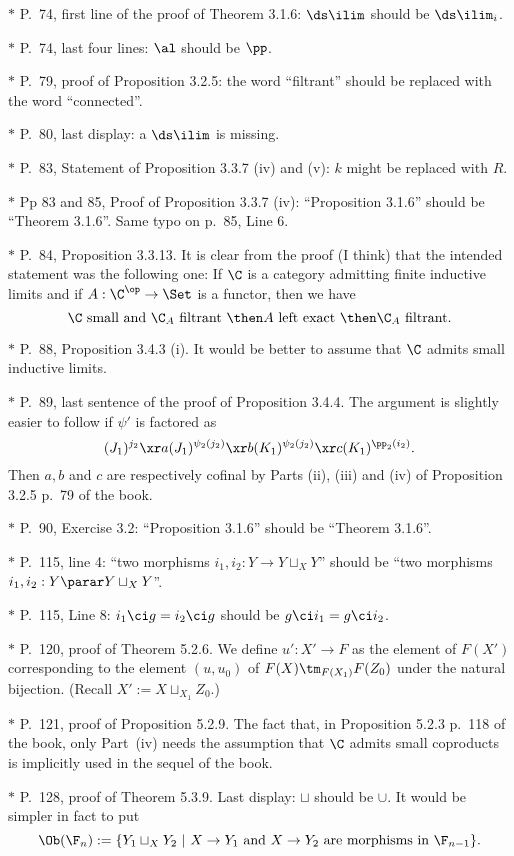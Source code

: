 \documentclass[12pt]{article}
\theoremstyle{remark}
\theoremstyle{definition}
\begin{document}
\nn$*$ P.~74, first line of the proof of Theorem 3.1.6: $\ds\ilim$ should be $\ds\ilim_i$. 

\nn$*$ P.~74, last four lines: $\al$ should be $\pp$.

\nn$*$ P.~79, proof of Proposition 3.2.5: the word ``filtrant'' should be replaced with the word ``connected''.

\nn$*$ P.~80, last display: a $\ds\ilim$ is missing.

\nn$*$ P.~83, Statement of Proposition 3.3.7 (iv) and (v): $k$ might be replaced with $R$. 

\nn$*$ Pp 83 and 85, Proof of Proposition 3.3.7 (iv): ``Proposition 3.1.6'' should be ``Theorem 3.1.6''. Same typo on p.~85, Line 6.

\nn$*$ P.~84, Proposition 3.3.13. It is clear from the proof (I think) that the intended statement was the following one: If $\C$ is a category admitting finite inductive limits and if $A:\C^{\op}\to\Set$ is a functor, then we have 
$$
\C\text{ small and }\C_A\text{ filtrant }\then A\text{ left exact }\then\C_A\text{ filtrant}.
$$

\nn$*$ P.~88, Proposition 3.4.3 (i). It would be better to assume that $\C$ admits small inductive limits.

\nn$*$ P.~89, last sentence of the proof of Proposition 3.4.4. The argument is slightly easier to follow if $\psi'$ is factored as 
$$
(J_1)^{j_2}\xr a(J_1)^{\psi_2(j_2)}\xr b(K_1)^{\psi_2(j_2)}\xr c(K_1)^{\pp_2(i_2)}.
$$ 
Then $a,b$ and $c$ are respectively cofinal by Parts (ii), (iii) and (iv) of Proposition 3.2.5 p.~79 of the book.

\nn$*$ P.~90, Exercise 3.2: ``Proposition 3.1.6'' should be ``Theorem 3.1.6''.

\nn$*$ P.~115, line 4: ``two morphisms $i_1,i_2:Y\to Y\sqcup_XY$'' should be ``two morphisms $i_1,i_2:Y\parar Y\sqcup_XY$''. 

\nn$*$ P.~115, Line 8: $i_1\ci g=i_2\ci g$ should be $g\ci i_1=g\ci i_2$.

\nn$*$ P.~120, proof of Theorem 5.2.6. We define $u':X'\to F$ as the element of $F(X')$ corresponding to the element $(u,u_0)$ of $F(X)\tm_{F(X_1)}F(Z_0)$ under the natural bijection. (Recall $X':=X\sqcup_{X_1}Z_0$.)

\nn$*$ P.~121, proof of Proposition 5.2.9. The fact that, in Proposition 5.2.3 p.~118 of the book, only Part~(iv) needs the assumption that $\C$ admits small coproducts is implicitly used in the sequel of the book.

\nn$*$ P.~128, proof of Theorem 5.3.9. Last display: $\sqcup$ should be $\cup$. It would be simpler in fact to put 
$$
\Ob(\F_n):=\{Y_1\sqcup_XY_2\ |\ X\to Y_1\text{ and }X\to Y_2\text{ are morphisms in }\F_{n-1}\}.
$$ 
\end{document}
